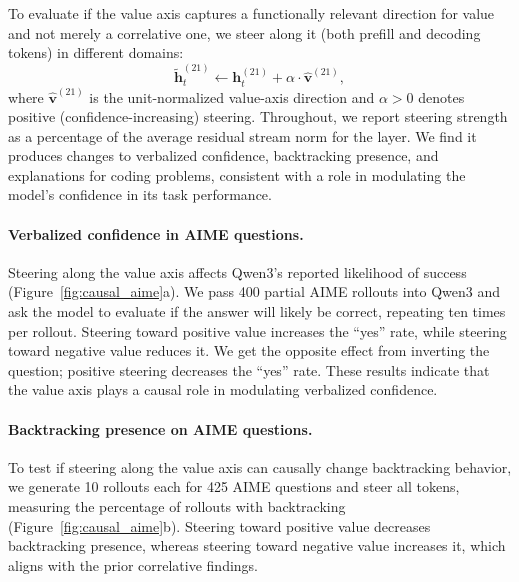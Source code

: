 \documentclass{article}
\begin{document}
To evaluate if the value axis captures a functionally relevant direction for value and not merely a correlative one, we steer along it (both prefill and decoding tokens) in different domains:
\begin{equation}
\tilde{\mathbf{h}}^{(21)}_t \leftarrow \mathbf{h}^{(21)}_t + \alpha \cdot \hat{\mathbf{v}}^{(21)},
\label{eq:steering}
\end{equation}
where $\hat{\mathbf{v}}^{(21)}$ is the unit-normalized value-axis direction and $\alpha > 0$ denotes positive (confidence-increasing) steering. Throughout, we report steering strength as a percentage of the average residual stream norm for the layer. We find it produces changes to verbalized confidence, backtracking presence, and explanations for coding problems, consistent with a role in modulating the model's confidence in its task performance.

\paragraph{Verbalized confidence in AIME questions.}
Steering along the value axis affects Qwen3's reported likelihood of success (Figure~\ref{fig:causal_aime}a). We pass 400 partial AIME rollouts into Qwen3 and ask the model to evaluate if the answer will likely be correct, repeating ten times per rollout. Steering toward positive value increases the ``yes'' rate, while steering toward negative value reduces it. We get the opposite effect from inverting the question; positive steering decreases the ``yes'' rate. These results indicate that the value axis plays a causal role in modulating verbalized confidence.

\paragraph{Backtracking presence on AIME questions.}
To test if steering along the value axis can causally change backtracking behavior, we generate 10 rollouts each for 425 AIME questions and steer all tokens, measuring the percentage of rollouts with backtracking (Figure~\ref{fig:causal_aime}b). Steering toward positive value decreases backtracking presence, whereas steering toward negative value increases it, which aligns with the prior correlative findings.
\end{document}
